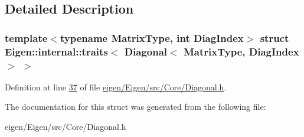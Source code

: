 \subsection{Detailed Description}
\subsubsection*{template$<$typename Matrix\+Type, int Diag\+Index$>$\newline
struct Eigen\+::internal\+::traits$<$ Diagonal$<$ Matrix\+Type, Diag\+Index $>$ $>$}



Definition at line \hyperlink{eigen_2_eigen_2src_2_core_2_diagonal_8h_source_l00037}{37} of file \hyperlink{eigen_2_eigen_2src_2_core_2_diagonal_8h_source}{eigen/\+Eigen/src/\+Core/\+Diagonal.\+h}.



The documentation for this struct was generated from the following file\+:\begin{DoxyCompactItemize}
\item 
eigen/\+Eigen/src/\+Core/\+Diagonal.\+h\end{DoxyCompactItemize}
